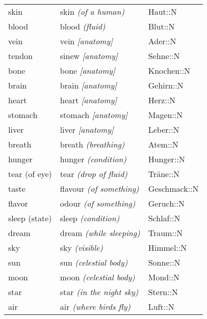 \begin{center}
\begin{longtable}{lll}
{\sc \lowercase{	SKIN	}}	&	skin	\textit{\footnotesize (of a human)}	&	Haut::N	\\
{\sc \lowercase{	BLOOD	}}	&	blood	\textit{\footnotesize (fluid)}	&	Blut::N	\\
{\sc \lowercase{	VEIN	}}	&	vein	\textit{\footnotesize [anatomy]}	&	Ader::N	\\
{\sc \lowercase{	TENDON	}}	&	sinew	\textit{\footnotesize [anatomy]}	&	Sehne::N	\\
{\sc \lowercase{	BONE	}}	&	bone	\textit{\footnotesize [anatomy]}	&	Knochen::N	\\
{\sc \lowercase{	BRAIN	}}	&	brain	\textit{\footnotesize [anatomy]}	&	Gehirn::N	\\
{\sc \lowercase{	HEART	}}	&	heart	\textit{\footnotesize [anatomy]}	&	Herz::N	\\
{\sc \lowercase{	STOMACH	}}	&	stomach	\textit{\footnotesize [anatomy]}	&	Magen::N	\\
{\sc \lowercase{	LIVER	}}	&	liver	\textit{\footnotesize [anatomy]}	&	Leber::N	\\
{\sc \lowercase{	BREATH	}}	&	breath	\textit{\footnotesize (breathing)}	&	Atem::N	\\
{\sc \lowercase{	HUNGER	}}	&	hunger	\textit{\footnotesize (condition)}	&	Hunger::N	\\
{\sc \lowercase{	TEAR \footnotesize (OF EYE)	}}	&	tear	\textit{\footnotesize (drop of fluid)}	&	Träne::N	\\
{\sc \lowercase{	TASTE	}}	&	flavour	\textit{\footnotesize (of something)}	&	Geschmack::N	\\
{\sc \lowercase{	FLAVOR	}}	&	odour	\textit{\footnotesize (of something)}	&	Geruch::N	\\
{\sc \lowercase{	SLEEP \footnotesize (STATE)	}}	&	sleep	\textit{\footnotesize (condition)}	&	Schlaf::N	\\
{\sc \lowercase{	DREAM	}}	&	dream	\textit{\footnotesize (while sleeping)}	&	Traum::N	\\
{\sc \lowercase{	SKY	}}	&	sky	\textit{\footnotesize (visible)}	&	Himmel::N	\\
{\sc \lowercase{	SUN	}}	&	sun	\textit{\footnotesize (celestial body)}	&	Sonne::N	\\
{\sc \lowercase{	MOON	}}	&	moon	\textit{\footnotesize (celestial body)}	&	Mond::N	\\
{\sc \lowercase{	STAR	}}	&	star	\textit{\footnotesize (in the night sky)}	&	Stern::N	\\
{\sc \lowercase{	AIR	}}	&	air	\textit{\footnotesize (where birds fly)}	&	Luft::N	\\

\end{longtable}
\end{center}
